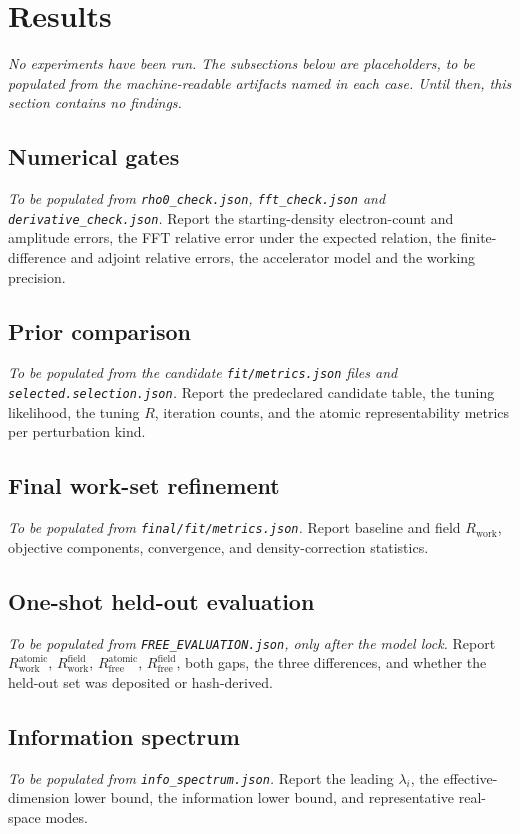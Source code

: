 \documentclass[11pt]{article}
\newcommand{\Rwork}{\ensuremath{R_{\mathrm{work}}}}
\begin{document}
\section{Results}
\label{sec:results}
\textit{No experiments have been run. The subsections below are placeholders, to be
populated from the machine-readable artifacts named in each case. Until then, this section
contains no findings.}

\subsection{Numerical gates}
\textit{To be populated from \texttt{rho0\_check.json}, \texttt{fft\_check.json} and
\texttt{derivative\_check.json}.} Report the starting-density electron-count and amplitude
errors, the FFT relative error under the expected relation, the finite-difference and
adjoint relative errors, the accelerator model and the working precision.

\subsection{Prior comparison}
\textit{To be populated from the candidate \texttt{fit/metrics.json} files and
\texttt{selected.selection.json}.} Report the predeclared candidate table, the tuning
likelihood, the tuning $R$, iteration counts, and the atomic representability metrics per
perturbation kind.

\subsection{Final work-set refinement}
\textit{To be populated from \texttt{final/fit/metrics.json}.} Report baseline and field
\Rwork, objective components, convergence, and density-correction statistics.

\subsection{One-shot held-out evaluation}
\textit{To be populated from \texttt{FREE\_EVALUATION.json}, only after the model lock.}
Report $R_{\mathrm{work}}^{\mathrm{atomic}}$, $R_{\mathrm{work}}^{\mathrm{field}}$,
$R_{\mathrm{free}}^{\mathrm{atomic}}$, $R_{\mathrm{free}}^{\mathrm{field}}$, both gaps, the
three differences, and whether the held-out set was deposited or hash-derived.

\subsection{Information spectrum}
\textit{To be populated from \texttt{info\_spectrum.json}.} Report the leading $\lambda_i$,
the effective-dimension lower bound, the information lower bound, and representative
real-space modes.
\end{document}
